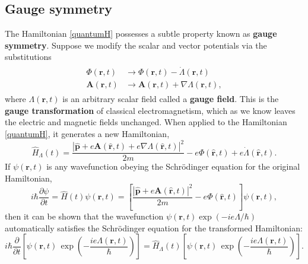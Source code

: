 \documentclass[pra,12pt]{revtex4}
\begin{document}
\subsection{Gauge symmetry}
\label{sec:gauge}

The Hamiltonian \eqref{quantumH} possesses a subtle property known as
\textbf{gauge symmetry}.  Suppose we modify the scalar and vector
potentials via the substitutions
\begin{align}
  \begin{aligned}
    \Phi(\mathbf{r},t) &\rightarrow \Phi(\mathbf{r},t) - \dot{\Lambda}(\mathbf{r},t)\\
    \mathbf{A}(\mathbf{r},t) &\rightarrow
    \mathbf{A}(\mathbf{r},t) + \nabla{\Lambda}(\mathbf{r},t),
  \end{aligned}
\end{align}
where $\Lambda(\mathbf{r},t)$ is an arbitrary scalar field called a
\textbf{gauge field}.  This is the \textbf{gauge transformation} of
classical electromagnetism, which as we know leaves the electric and
magnetic fields unchanged.  When applied to the Hamiltonian
\eqref{quantumH}, it generates a new Hamiltonian,
\begin{equation}
  \hat{H}_\Lambda(t)
  = \frac{|\hat{\mathbf{p}}+e\mathbf{A}(\hat{\mathbf{r}},t) + e\nabla\Lambda(\hat{\mathbf{r}},t)|^2}{2m}
  - e\Phi(\hat{\mathbf{r}},t) + e\dot{\Lambda}(\hat{\mathbf{r}},t).
\end{equation}
If $\psi(\mathbf{r},t)$ is any wavefunction obeying the Schr\"odinger
equation for the original Hamiltonian,
\begin{equation}
  i\hbar\frac{\partial\psi}{\partial t} =
  \hat{H}(t) \psi(\mathbf{r},t)
  = \left[\frac{|\hat{\mathbf{p}}+e\mathbf{A}(\hat{\mathbf{r}},t)|^2}{2m}
  - e\Phi(\hat{\mathbf{r}},t) \right]\psi(\mathbf{r},t),
\end{equation}
then it can be shown that the wavefunction $\psi(\mathbf{r},t)
\exp(-ie\Lambda/\hbar)$ automatically satisfies the Schr\"odinger
equation for the transformed Hamiltonian:
\begin{equation}
  i\hbar\frac{\partial}{\partial t} \left[\psi(\mathbf{r},t) \, \exp\left(-\frac{ie\Lambda(\mathbf{r},t)}{\hbar}\right)\right] =
  \hat{H}_\Lambda(t) \left[\psi(\mathbf{r},t) \, \exp\left(-\frac{ie\Lambda(\mathbf{r},t)}{\hbar}\right)\right].
  \label{gaugeschrod}
\end{equation}
\end{document}
